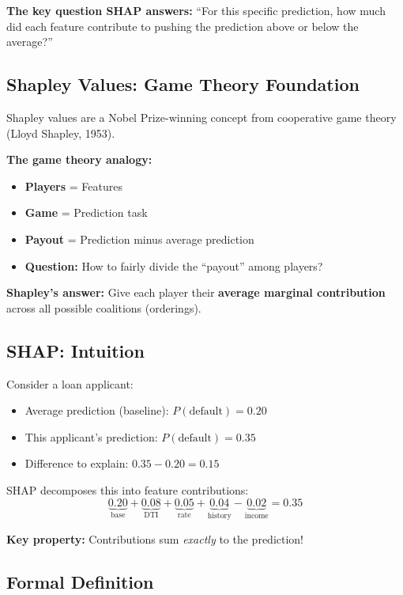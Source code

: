 \documentclass[11pt,a4paper]{article}
\newcommand{\keyword}[1]{\textbf{\textcolor{AccentOrange}{#1}}}
\begin{document}
\textbf{The key question SHAP answers:} ``For this specific prediction, how much did each feature contribute to pushing the prediction above or below the average?''

\subsection{Shapley Values: Game Theory Foundation}

Shapley values are a Nobel Prize-winning concept from cooperative game theory (Lloyd Shapley, 1953).

\textbf{The game theory analogy:}
\begin{itemize}
    \item \textbf{Players} = Features
    \item \textbf{Game} = Prediction task
    \item \textbf{Payout} = Prediction minus average prediction
    \item \textbf{Question:} How to fairly divide the ``payout'' among players?
\end{itemize}

\textbf{Shapley's answer:} Give each player their \keyword{average marginal contribution} across all possible coalitions (orderings).

\subsection{SHAP: Intuition}

Consider a loan applicant:
\begin{itemize}
    \item Average prediction (baseline): $P(\text{default}) = 0.20$
    \item This applicant's prediction: $P(\text{default}) = 0.35$
    \item Difference to explain: $0.35 - 0.20 = 0.15$
\end{itemize}

SHAP decomposes this into feature contributions:
\[
\underbrace{0.20}_{\text{base}} + \underbrace{0.08}_{\text{DTI}} + \underbrace{0.05}_{\text{rate}} + \underbrace{0.04}_{\text{history}} - \underbrace{0.02}_{\text{income}} = 0.35
\]

\textbf{Key property:} Contributions sum \emph{exactly} to the prediction!

\subsection{Formal Definition}
\end{document}
